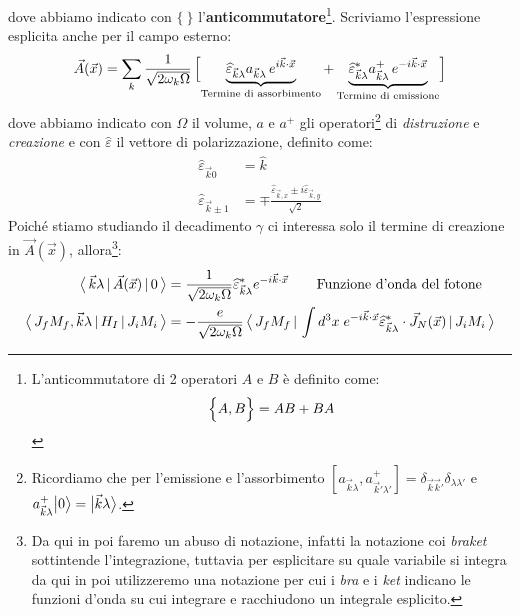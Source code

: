 dove abbiamo indicato con $\bigl\{\:\bigr\}$ l'\textbf{anticommutatore}\footnote{L'anticommutatore di 2 operatori $A$ e $B$ è definito come:
$$\Bigl\{A,B\Bigr\} = AB+BA$$}. Scriviamo l'espressione esplicita anche per il campo esterno:
$$\vec{A}(\vec{x}) = \sum_k \frac{1}{\sqrt{2\omega_k\Omega}}\, \Bigl [ \underbrace{\widehat{\varepsilon}_{\vec{k}\lambda} a_{\vec{k}\lambda}\, e^{i\vec{k}\cdot\vec{x}}}_\text{Termine di assorbimento} + \underbrace{\widehat{\varepsilon}_{\vec{k}\lambda}^* a_{\vec{k}\lambda}^+\, e^{-i\vec{k}\cdot\vec{x}}}_\text{Termine di emissione}  \Bigr ]$$
dove abbiamo indicato con $\Omega$ il volume, $a$ e $a^+$ gli operatori\footnote{Ricordiamo che per l'emissione e l'assorbimento $[a_{\vec{k}\lambda},a_{\vec{k}'\lambda'}^+] = \delta_{\vec{k}\vec{k}'}\delta_{\lambda\lambda'}$ e $a^+_{\vec{k}\lambda} \bigl | 0 \bigr \rangle = \bigl | \vec{k}\lambda \bigr \rangle$.} di \textit{distruzione} e \textit{creazione} e con $\widehat{\varepsilon}$ il vettore di polarizzazione, definito come:
\begin{displaymath}
\begin{aligned}
\widehat{\varepsilon}_{\vec{k}0} &= \widehat{k} \\
\widehat{\varepsilon}_{\vec{k}\pm 1} &= \mp \frac{\widehat{\varepsilon}_{\vec{k},x}\pm i\widehat{\varepsilon}_{\vec{k},y}}{\sqrt{2}}
\end{aligned}
\end{displaymath}
Poiché stiamo studiando il decadimento $\gamma$ ci interessa solo il termine di creazione in $\vec{A}(\vec{x})$, allora\footnote{Da qui in poi faremo un abuso di notazione, infatti la notazione coi \textit{braket} sottintende l'integrazione, tuttavia per esplicitare su quale variabile si integra da qui in poi utilizzeremo una notazione per cui i \textit{bra} e i \textit{ket} indicano le funzioni d'onda su cui integrare e racchiudono un integrale esplicito.}:
\begin{displaymath}
\begin{aligned}
\oss{\vec{k}\lambda}{\vec{A}(\vec{x})}{0} &= \frac{1}{\sqrt{2\omega_k\Omega}} \widehat{\varepsilon}^*_{\vec{k}\lambda} e^{-i\vec{k}\cdot\vec{x}}\qquad \text{Funzione d'onda del fotone} \\
%
\oss{J_f M_f,\vec{k}\lambda}{H_I}{J_i M_i} &= - \frac{e}{\sqrt{2\omega_k\Omega}} \, \oss{J_f M_f}{\int d^3x \; e^{-i\vec{k}\cdot\vec{x}}\widehat{\varepsilon}^*_{\vec{k}\lambda}\cdot\vec{J}_N (\vec{x})}{J_i M_i}
\end{aligned}
\end{displaymath}
